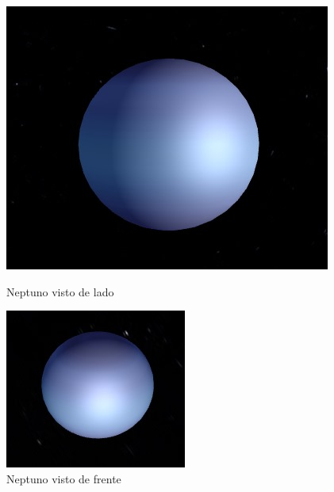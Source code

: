 \documentclass[12pt,a4paper]{memoir}
\begin{document}
\begin{figure}[!htb]
\centering
\begin{minipage}{0.45\textwidth}
  \centering
  \includegraphics[width=1.2\linewidth]{luz1.jpg}
  \caption{Neptuno visto de lado}
\end{minipage}
\hfill
\begin{minipage}{0.45\textwidth}
  \centering
  \includegraphics[width=1.115\linewidth]{luz2.jpg}
  \caption{Neptuno visto de frente}
\end{minipage}
\end{figure}
\end{document}
